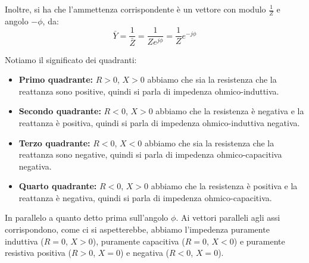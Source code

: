 \documentclass[a4paper,11pt]{article}
\begin{document}
Inoltre, si  ha che l'ammettenza corrispondente è un vettore con modulo $\frac{1}{Z}$ e angolo $-\phi$, da:
$$
\bar{Y} = \frac{1}{\bar{Z}} = \frac{1}{Ze^{j\phi}} = \frac{1}{Z} e^{-j\phi}
$$

\begin{center}
\end{center}

Notiamo il significato dei quadranti: 
\begin{itemize}
	\item \textbf{Primo quadrante:} $R > 0$, $X > 0$ abbiamo che sia la resistenza che la reattanza sono positive, quindi si parla di impedenza ohmico-induttiva.
	\item \textbf{Secondo quadrante:} $R < 0$, $X > 0$ abbiamo che la resistenza è negativa e la reattanza è positiva, quindi si parla di impedenza ohmico-induttiva negativa.
	\item \textbf{Terzo quadrante:} $R < 0$, $X < 0$ abbiamo che sia la resistenza che la reattanza sono negative, quindi si parla di impedenza ohmico-capacitiva negativa.
	\item \textbf{Quarto quadrante:} $R < 0$, $X > 0$ abbiamo che la resistenza è positiva e la reattanza è negativa, quindi si parla di impedenza ohmico-capacitiva.
\end{itemize}

In parallelo a quanto detto prima sull'angolo $\phi$.
Ai vettori paralleli agli assi corrispondono, come ci si aspetterebbe, abbiamo l'impedenza puramente induttiva ($R = 0$, $X > 0$), puramente capacitiva ($R = 0$, $X < 0$) e puramente resistiva positiva ($R > 0$, $X = 0$) e negativa ($R < 0$, $X = 0$).
\end{document}
